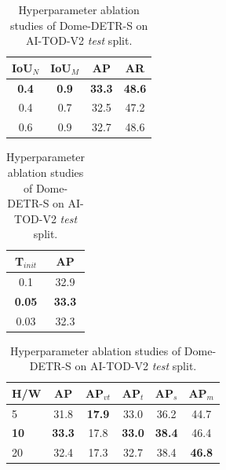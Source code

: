 \begin{table}[t]
    \caption{Hyperparameter ablation studies of Dome-DETR-S on AI-TOD-V2 \textit{test} split.}
    \centering
    \renewcommand{\arraystretch}{1.2}
    \small
    \tabcolsep=0.402cm
    \begin{minipage}[t]{\linewidth}
        \centering
        \hspace*{-0.385cm}
        \begin{minipage}{0.7\linewidth}
            \centering
            \begin{tabular}{cc|cc}
                \toprule
                \textbf{IoU$_{N}$} & \textbf{IoU$_{M}$} & \textbf{AP}  & \textbf{AR}  \\
                \midrule
                \rowcolor[HTML]{F5F5F5}\textbf{0.4} & \textbf{0.9} & \textbf{33.3} & \textbf{48.6} \\
                0.4 & 0.7 & 32.5 & 47.2 \\
                0.6 & 0.9 & 32.7 & 48.6 \\
                \bottomrule
            \end{tabular}
        \end{minipage}%
        \begin{minipage}{0.3\linewidth}
            \centering
            \begin{tabular}{c|c}
                \toprule
                \textbf{T$_{init}$} & \textbf{AP} \\
                \midrule
                0.1 & 32.9 \\
                \rowcolor[HTML]{F5F5F5} \textbf{0.05} & \textbf{33.3} \\
                0.03 & 32.3 \\
                \bottomrule
            \end{tabular}
        \end{minipage}
    \end{minipage}
    \vspace{0.15cm}
    \begin{minipage}{\linewidth}
        \centering
        \tabcolsep=0.43cm
        \begin{tabular}{l|ccccc}
            \toprule
            \textbf{H/W} & \textbf{AP} & \textbf{AP$_{vt}$} & \textbf{AP$_{t}$} & \textbf{AP$_{s}$} & \textbf{AP$_{m}$} \\
            \midrule
            5 & 31.8 & \textbf{17.9} & 33.0 & 36.2 & 44.7 \\
            \rowcolor[HTML]{F5F5F5} \textbf{10} & \textbf{33.3} & 17.8 & \textbf{33.0} & \textbf{38.4} & 46.4 \\
            20 & 32.4 & 17.3 & 32.7 & 38.4 & \textbf{46.8} \\
            \bottomrule
        \end{tabular}
    \end{minipage}
    \label{tab:ablation_hyperparameter}
\end{table}

